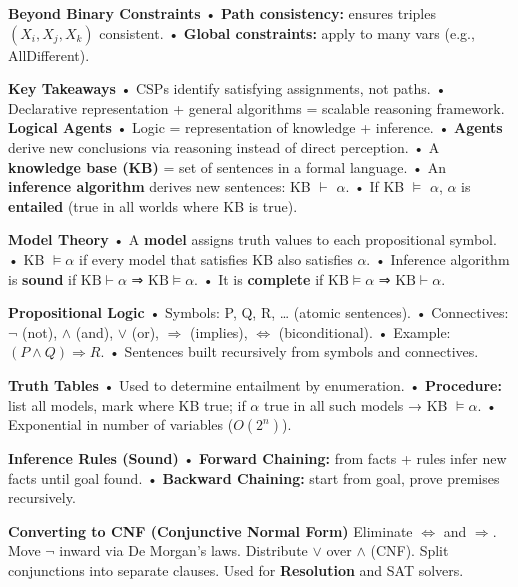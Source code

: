 ﻿\documentclass[10pt]{article}
\begin{document}
\begin{multicols*}{2}
\textbf{Beyond Binary Constraints}  
• \textbf{Path consistency:} ensures triples $(X_i,X_j,X_k)$ consistent.  
• \textbf{Global constraints:} apply to many vars (e.g., AllDifferent).  

\textbf{Key Takeaways}  
• CSPs identify satisfying assignments, not paths.  
• Declarative representation + general algorithms = scalable reasoning framework.  
\textbf{Logical Agents}  
• Logic = representation of knowledge + inference.  
• \textbf{Agents} derive new conclusions via reasoning instead of direct perception.  
• A \textbf{knowledge base (KB)} = set of sentences in a formal language.  
• An \textbf{inference algorithm} derives new sentences: KB $\vdash$ $\alpha$.  
• If KB $\models$ $\alpha$, $\alpha$ is \textbf{entailed} (true in all worlds where KB is true).  

\textbf{Model Theory}  
• A \textbf{model} assigns truth values to each propositional symbol.  
• KB $\models \alpha$ if every model that satisfies KB also satisfies $\alpha$.  
• Inference algorithm is \textbf{sound} if $\text{KB} \vdash \alpha$ ⇒ $\text{KB} \models \alpha$.  
• It is \textbf{complete} if $\text{KB} \models \alpha$ ⇒ $\text{KB} \vdash \alpha$.  

\textbf{Propositional Logic}  
• Symbols: P, Q, R, … (atomic sentences).  
• Connectives: $\neg$ (not), $\wedge$ (and), $\vee$ (or), $\Rightarrow$ (implies), $\Leftrightarrow$ (biconditional).  
• Example: $(P \wedge Q) \Rightarrow R$.  
• Sentences built recursively from symbols and connectives.  

\textbf{Truth Tables}  
• Used to determine entailment by enumeration.  
• \textbf{Procedure:} list all models, mark where KB true; if $\alpha$ true in all such models → KB $\models \alpha$.  
• Exponential in number of variables ($O(2^n)$).  

\textbf{Inference Rules (Sound)} 
• \textbf{Forward Chaining:} from facts + rules infer new facts until goal found.  
• \textbf{Backward Chaining:} start from goal, prove premises recursively.  

\textbf{Converting to CNF (Conjunctive Normal Form)}  
Eliminate $\Leftrightarrow$ and $\Rightarrow$.  
Move $\neg$ inward via De Morgan’s laws.  
Distribute $\vee$ over $\wedge$ (CNF).  
Split conjunctions into separate clauses.  
Used for \textbf{Resolution} and SAT solvers.  



\end{multicols*}
\end{document}
